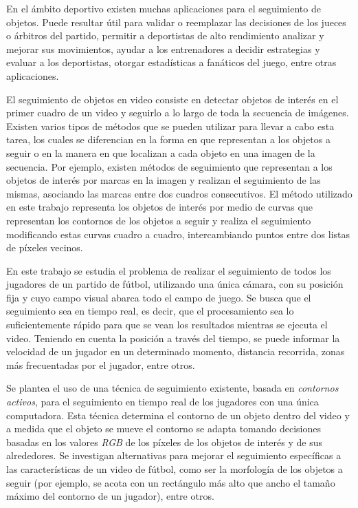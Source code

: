 \documentclass[a4paper,11pt]{report}
\begin{document}
En el ámbito deportivo existen muchas aplicaciones para el seguimiento de
objetos. Puede resultar útil para validar o reemplazar las decisiones de los
jueces o árbitros del partido, permitir a deportistas de alto rendimiento
analizar y mejorar sus movimientos, ayudar a los entrenadores a decidir
estrategias y evaluar a los deportistas, otorgar estadísticas a fanáticos del
juego, entre otras aplicaciones.

El seguimiento de objetos en video consiste en detectar objetos de interés en
el primer cuadro de un video y seguirlo a lo largo de toda la secuencia de
imágenes. Existen varios tipos de métodos que se pueden utilizar para llevar
a cabo esta tarea, los cuales se diferencian en la forma en que representan
a los objetos a seguir o en la manera en que localizan a cada objeto en una
imagen de la secuencia. Por ejemplo, existen métodos de seguimiento que
representan a los objetos de interés por marcas en la imagen y realizan el
seguimiento de las mismas, asociando las marcas entre dos cuadros consecutivos.
El método utilizado en este trabajo representa los objetos de interés por
medio de curvas que representan los contornos de los objetos a seguir y
realiza el seguimiento modificando estas curvas cuadro a cuadro,
intercambiando puntos entre dos listas de píxeles vecinos.

En este trabajo se estudia el problema de realizar el seguimiento de todos los
jugadores de un partido de fútbol, utilizando una única cámara, con su posición
fija y cuyo campo visual abarca todo el campo de juego. Se busca que el seguimiento sea en
tiempo real, es decir, que el procesamiento sea lo suficientemente rápido para
que se vean los resultados mientras se ejecuta el video. Teniendo en cuenta la posición
a través del tiempo, se puede informar la velocidad de un jugador en un
determinado momento, distancia recorrida, zonas más frecuentadas por el
jugador, entre otros.

Se plantea el uso de una técnica de seguimiento existente, basada en
\textit{contornos activos}, para el seguimiento en tiempo real de los
jugadores con una única computadora. Esta técnica determina el contorno de
un objeto dentro del video y a medida que el objeto se mueve el contorno se
adapta tomando decisiones basadas en los valores \textit{RGB} de los píxeles
de los objetos de interés y de sus alrededores.
Se investigan alternativas para mejorar el seguimiento específicas a las
características de un video de fútbol, como ser la morfología de los objetos
a seguir (por ejemplo, se acota con un rectángulo más alto que ancho el
tamaño máximo del contorno de un jugador), entre otros.
\end{document}
